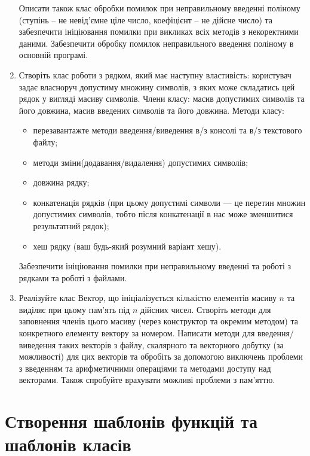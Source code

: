 \documentclass[a5paper,titlepage,openany,twoside,
]
{book_unv}%
\begin{document}
\begin{enumerate}
Описати також клас обробки помилок при неправильному введенні поліному
(ступінь -- не невід'ємне ціле число, коефіцієнт -- не дійсне число) та
забезпечити ініціювання помилки при викликах всіх методів з некоректними даними.
Забезпечити обробку помилок неправильного введення поліному в основній програмі.

\item
Створіть клас роботи з рядком, який має наступну властивість: 
користувач задає власноруч допустиму множину символів, з яких може складатись цей рядок
у вигляді масиву символів. Члени класу: масив допустимих символів та його довжина,
масив введених символів та його довжина.
Методи класу:
\begin{itemize}
\item
перезавантажте методи введення/виведення в/з консолі та в/з текстового файлу;
\item
методи зміни(додавання/видалення) допустимих символів;
\item
довжина рядку;
\item
конкатенація рядків (при цьому допустимі символи --- це перетин 
множин допустимих символів, 
тобто після конкатенації в нас може зменшитися результатний рядок);
\item
хеш рядку (ваш будь-який розумний варіант хешу).
\end{itemize}
Забезпечити ініціювання помилки при неправильному введенні та роботі з рядками 
та роботі з файлами.

\item

Реалізуйте клас Вектор, що ініціалізується кількістю елементів масиву $n$
  та виділяє при цьому пам'ять під $n$ дійсних чисел. Створіть методи для
  заповнення членів цього масиву (через конструктор та окремим методом)
  та конкретного елементу вектору за номером. 
  Написати методи для введення/виведення таких векторів з файлу,
  скалярного та векторного добутку (за можливості) для цих векторів та обробіть
  за допомогою виключень проблеми з введенням та арифметичними операціями та методами 
 доступу над векторами. Також спробуйте врахувати можливі проблеми з пам'яттю.
 
\end{enumerate}


\chapter{Створення шаблонів функцій та шаблонів класів}
%
\end{document}
